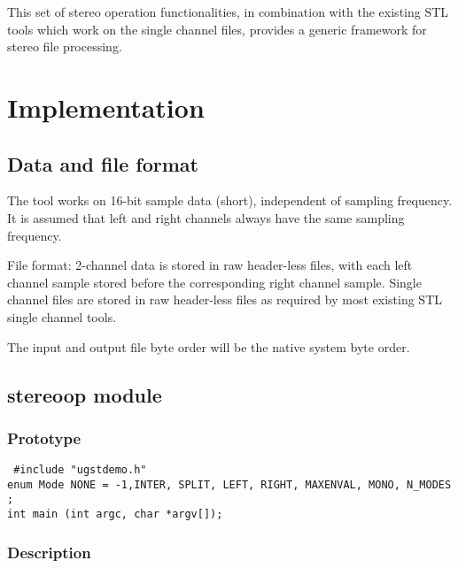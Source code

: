 
This set of stereo operation functionalities, in combination with the
existing STL tools which work on the single channel files, provides a
generic framework for stereo file processing.

\section{Implementation}

\subsection{Data and file format}
The tool works on 16-bit sample data (short), independent of sampling
frequency. It is assumed that left and right channels always have the
same sampling frequency.

File format: 2-channel data is stored in raw header-less files, with
each left channel sample stored before the corresponding right channel
sample. Single channel files are stored in raw header-less files as
required by most existing STL single channel tools.

The input and output file byte order will be the native system byte
order.

\subsection{stereoop module}

\subsubsection{Prototype}

{\tt {\small
\#include "ugstdemo.h"\\
enum Mode{ NONE = -1,INTER, SPLIT, LEFT, RIGHT, MAXENVAL, MONO,
N\_MODES };\\
int main (int argc, char *argv[]);
}}

\subsubsection{Description}

